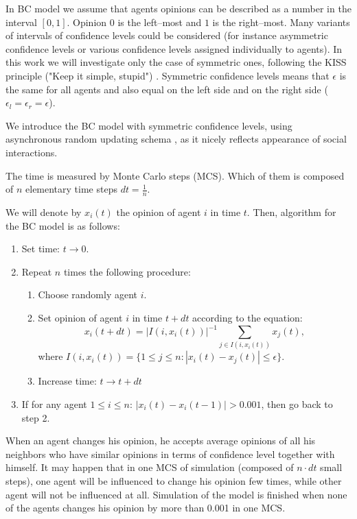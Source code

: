 \documentclass[a4paper, 12pt]{article}
\begin{document}
In BC model we assume that agents opinions can be described as a number in the interval $[0, 1]$. Opinion $0$ is the left--most and $1$ is the right--most. Many variants of intervals of confidence levels could be considered (for instance asymmetric confidence levels or various confidence levels assigned individually to agents). In this work we will investigate only the case of symmetric ones, following the KISS principle ("Keep it simple, stupid") \cite{kiss}. Symmetric confidence levels means that $\epsilon$ is the same for all agents and also equal on the left side and on the right side ($\epsilon_l=\epsilon_r=\epsilon$). 
\indent

We introduce the BC model with symmetric confidence levels, using asynchronous random updating schema \cite{sai}, as it nicely reflects appearance of social interactions. 
\indent

The time is measured by Monte Carlo steps (MCS). Which of them is composed of $n$ elementary time steps $dt=\frac{1}{n}$. 

\indent
We will denote by $x_i(t)$ the opinion of agent $i$ in time $t$. Then, algorithm for the BC model is as follows:

\begin{enumerate}
\item Set time: $t \rightarrow 0$.
\item Repeat $n$ times the following procedure:
	\begin{enumerate}
	\item Choose randomly agent $i$.
	\item Set opinion of agent $i$ in time $t+dt$ according to the equation:
	\begin{equation}
	x_i(t+dt) = \left| I(i, x_i(t)) \right|^{-1} \sum_{j \in I(i, x_i(t))} {x_j(t)},
	\label{bceq}
	\end{equation}
	where $I(i, x_i(t)) = \{1 \leq j \leq n: \left| x_i(t) - x_j(t) \right| \leq \epsilon \}$.
	\item Increase time: $t \rightarrow t + dt$
	\end{enumerate}
\item If for any agent $1 \leq i \leq n$: $|x_i(t) - x_i(t-1)| > 0.001$, then go back to step 2.
\end{enumerate}
\indent

When an agent changes his opinion, he accepts average opinions of all his neighbors who have similar opinions in terms of confidence level together with himself. It may happen that in one MCS of simulation (composed of $n \cdot dt$ small steps), one agent will be influenced to change his opinion few times, while other agent will not be influenced at all. Simulation of the model is finished when none of the agents changes his opinion by more than 0.001 in one MCS.
\end{document}
